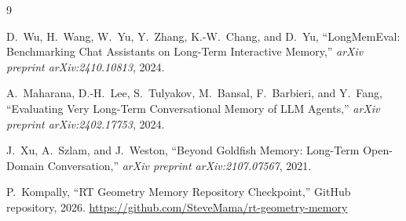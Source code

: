 \documentclass[conference]{IEEEtran}
\begin{document}
\begin{thebibliography}{9}

D.~Wu, H.~Wang, W.~Yu, Y.~Zhang, K.-W.~Chang, and D.~Yu,
``LongMemEval: Benchmarking Chat Assistants on Long-Term Interactive Memory,''
\emph{arXiv preprint arXiv:2410.10813}, 2024.

A.~Maharana, D.-H.~Lee, S.~Tulyakov, M.~Bansal, F.~Barbieri, and Y.~Fang,
``Evaluating Very Long-Term Conversational Memory of LLM Agents,''
\emph{arXiv preprint arXiv:2402.17753}, 2024.

J.~Xu, A.~Szlam, and J.~Weston,
``Beyond Goldfish Memory: Long-Term Open-Domain Conversation,''
\emph{arXiv preprint arXiv:2107.07567}, 2021.

P.~Kompally,
``RT Geometry Memory Repository Checkpoint,''
GitHub repository, 2026.
\url{https://github.com/SteveMama/rt-geometry-memory}

\end{thebibliography}
\end{document}
